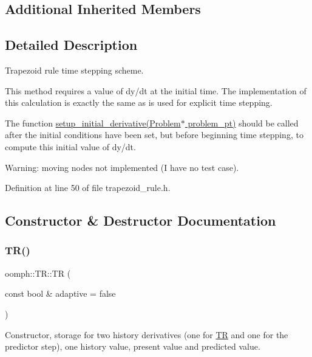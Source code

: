 \subsection*{Additional Inherited Members}


\subsection{Detailed Description}
Trapezoid rule time stepping scheme.

This method requires a value of dy/dt at the initial time. The implementation of this calculation is exactly the same as is used for explicit time stepping.

The function \hyperlink{classoomph_1_1TR_abde5c3804dd51162f11c50dacb65b315}{setup\+\_\+initial\+\_\+derivative(\+Problem$\ast$ problem\+\_\+pt)} should be called after the initial conditions have been set, but before beginning time stepping, to compute this initial value of dy/dt.

Warning\+: moving nodes not implemented (I have no test case). 

Definition at line 50 of file trapezoid\+\_\+rule.\+h.



\subsection{Constructor \& Destructor Documentation}
\mbox{\label{classoomph_1_1TR_ac83377c97c81b2fa5afbf12c56bbb52f}} 
\subsubsection{\texorpdfstring{T\+R()}{TR()}\hspace{0.1cm}{\footnotesize\ttfamily [1/2]}}
{\footnotesize\ttfamily oomph\+::\+T\+R\+::\+TR (\begin{DoxyParamCaption}\item[{const bool \&}]{adaptive = {\ttfamily false} }\end{DoxyParamCaption})\hspace{0.3cm}{\ttfamily [inline]}}

Constructor, storage for two history derivatives (one for \hyperlink{classoomph_1_1TR}{TR} and one for the predictor step), one history value, present value and predicted value. 

